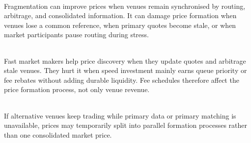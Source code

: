 \begin{mechanism} \\
Fragmentation can improve prices when venues remain synchronised by routing, arbitrage, and consolidated information. It can damage price formation when venues lose a common reference, when primary quotes become stale, or when market participants pause routing during stress.
\end{mechanism}

\begin{mechanism} \\
Fast market makers help price discovery when they update quotes and arbitrage stale venues. They hurt it when speed investment mainly earns queue priority or fee rebates without adding durable liquidity. Fee schedules therefore affect the price formation process, not only venue revenue.
\end{mechanism}

\begin{caveat} \\
If alternative venues keep trading while primary data or primary matching is unavailable, prices may temporarily split into parallel formation processes rather than one consolidated market price.
\end{caveat}
